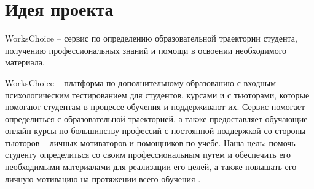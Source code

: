 \documentclass[12pt]{article}
\begin{document}
\makeTitlePage

{
  \hypersetup{linkcolor=black}
  \tableofcontents
}

\hypersetup{linkcolor=black}

\section{Идея проекта}

WorksChoice -- сервис по определению образовательной траектории студента, получению профессиональных знаний и помощи в освоении необходимого материала. 

WorksChoice -- платформа по дополнительному образованию с входным психологическим тестированием для студентов, курсами и с тьюторами, которые помогают студентам в процессе обучения и поддерживают их. Сервис помогает определиться с образовательной траекторией, а также предоставляет обучающие онлайн-курсы по большинству профессий с постоянной поддержкой со стороны тьюторов -- личных мотиваторов и помощников по учебе. 
Наша цель: помочь студенту определиться со своим профессиональным путем и обеспечить его необходимыми материалами для реализации его целей, а также повышать его личную мотивацию на протяжении всего обучения \cite{Kobzov}.
\end{document}
